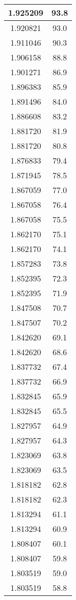 \documentclass[a4paper,12pt]{article}
\begin{document}
\begin{center}
\begin{longtable}{|c|c|}
1.925209 & 93.8 \\ \hline
1.920821 & 93.0 \\ \hline
1.911046 & 90.3 \\ \hline
1.906158 & 88.8 \\ \hline
1.901271 & 86.9 \\ \hline
1.896383 & 85.9 \\ \hline
1.891496 & 84.0 \\ \hline
1.886608 & 83.2 \\ \hline
1.881720 & 81.9 \\ \hline
1.881720 & 80.8 \\ \hline
1.876833 & 79.4 \\ \hline
1.871945 & 78.5 \\ \hline
1.867059 & 77.0 \\ \hline
1.867058 & 76.4 \\ \hline
1.867058 & 75.5 \\ \hline
1.862170 & 75.1 \\ \hline
1.862170 & 74.1 \\ \hline
1.857283 & 73.8 \\ \hline
1.852395 & 72.3 \\ \hline
1.852395 & 71.9 \\ \hline
1.847508 & 70.7 \\ \hline
1.847507 & 70.2 \\ \hline
1.842620 & 69.1 \\ \hline
1.842620 & 68.6 \\ \hline
1.837732 & 67.4 \\ \hline
1.837732 & 66.9 \\ \hline
1.832845 & 65.9 \\ \hline
1.832845 & 65.5 \\ \hline
1.827957 & 64.9 \\ \hline
1.827957 & 64.3 \\ \hline
1.823069 & 63.8 \\ \hline
1.823069 & 63.5 \\ \hline
1.818182 & 62.8 \\ \hline
1.818182 & 62.3 \\ \hline
1.813294 & 61.1 \\ \hline
1.813294 & 60.9 \\ \hline
1.808407 & 60.1 \\ \hline
1.808407 & 59.8 \\ \hline
1.803519 & 59.0 \\ \hline
1.803519 & 58.8 \\ \hline

\end{longtable}
\end{center}
\end{document}

